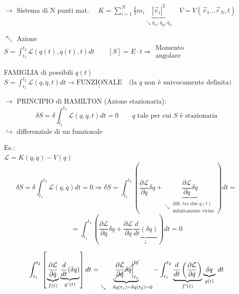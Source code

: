 \documentclass[12pt,a4paper]{article}
\begin{document}
\vspace{0.3cm}
$\rightarrow$ Sistema di N punti mat. $\quad K = \sum_{i=1}^N \frac{1}{2} m_i \underbrace{|\vec{v}_i|^2}_{\searrow \dot{q}_{ix}, \dot{q}_{iy}, \dot{q}_{iz}} \quad V = V(\vec{r}_1 \dots \vec{r}_N, t)$

\vspace{0.3cm}
\noindent $\nwarrow$ Azione \\
$S = \int_{t_1}^{t_2} \mathcal{L}(q(t), \dot{q}(t), t) dt \qquad [S] = E \cdot t \Rightarrow \substack{\text{Momento} \\ \text{angolare}}$


\noindent FAMIGLIA di possibili $q(t)$ \\
$S = \int_{t_1}^{t_2} \mathcal{L}(q, \dot{q}, t) dt \rightarrow \underline{\underline{\text{FUNZIONALE}}} \quad \text{(la } q \text{ non è univocamente definita)}$

\vspace{0.5cm}
\noindent $\rightarrow$ PRINCIPIO di HAMILTON (Azione stazionaria):
\begin{equation*}
    \boxed{ \delta S = \delta \int_{t_1}^{t_2} \mathcal{L}(q, \dot{q}, t) dt = 0 } \qquad q \text{ tale per cui } S \text{ è stazionaria}
\end{equation*}
$\hookrightarrow$ differenziale di un funzionale

\vspace{0.3cm}
\noindent Es.: \\
$\mathcal{L} = K(q, \dot{q}) - V(q)$
\begin{equation*}
    \delta S = \delta \int_{t_1}^{t_2} \mathcal{L}(q, \dot{q}) dt = 0 \Rightarrow \delta S = \int_{t_1}^{t_2} \left( \frac{\partial \mathcal{L}}{\partial q} \delta q + \underbrace{\frac{\partial \mathcal{L}}{\partial \dot{q}} \delta \dot{q}}_{\searrow \substack{\text{diff. tra due } q(t) \\ \text{infinitamente vicine}}} \right) dt =
\end{equation*}
\begin{equation*}
    = \int_{t_1}^{t_2} \left( \frac{\partial \mathcal{L}}{\partial q} \delta q + \frac{\partial \mathcal{L}}{\partial \dot{q}} \underbrace{\frac{d}{dt} (\delta q)}_{\downarrow} \right) dt = 0
\end{equation*}

\begin{equation*}
    \int_{t_1}^{t_2} \left[ \underbrace{\frac{\partial \mathcal{L}}{\partial \dot{q}}}_{f(t)} \underbrace{\frac{d}{dt} (\delta q)}_{g'(t)} \right] dt = \underbrace{\cancel{\left. \frac{\partial \mathcal{L}}{\partial \dot{q}} \delta q \right|_{t_1}^{t_2}}}_{\searrow \quad \delta q(t_1) = \delta q(t_2) = 0} - \int_{t_1}^{t_2} \underbrace{\frac{d}{dt} \left( \frac{\partial \mathcal{L}}{\partial \dot{q}} \right)}_{f'(t)} \underbrace{\delta q}_{g(t)} \, dt
\end{equation*}
\end{document}
